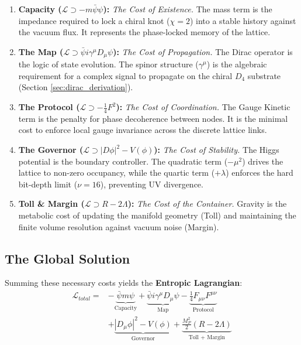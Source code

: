 \begin{enumerate}
    \item \textbf{Capacity ($\mathcal{L} \supset -m\bar{\psi}\psi$):} 
    \textit{The Cost of Existence.} The mass term is the impedance required to lock a chiral knot ($\chi=2$) into a stable history against the vacuum flux. It represents the phase-locked memory of the lattice.

    \item \textbf{The Map ($\mathcal{L} \supset \bar{\psi} i \gamma^\mu D_\mu \psi$):} 
    \textit{The Cost of Propagation.} The Dirac operator is the logic of state evolution. The spinor structure ($\gamma^\mu$) is the algebraic requirement for a complex signal to propagate on the chiral $D_4$ substrate (Section \ref{sec:dirac_derivation}).

    \item \textbf{The Protocol ($\mathcal{L} \supset -\frac{1}{4}F^2$):} 
    \textit{The Cost of Coordination.} The Gauge Kinetic term is the penalty for phase decoherence between nodes. It is the minimal cost to enforce local gauge invariance across the discrete lattice links.

    \item \textbf{The Governor ($\mathcal{L} \supset |D\phi|^2 - V(\phi)$):} 
    \textit{The Cost of Stability.} The Higgs potential is the boundary controller. The quadratic term ($-\mu^2$) drives the lattice to non-zero occupancy, while the quartic term ($+\lambda$) enforces the hard bit-depth limit ($\nu=16$), preventing UV divergence.

    \item \textbf{Toll \& Margin ($\mathcal{L} \supset R - 2\Lambda$):} 
    \textit{The Cost of the Container.} Gravity is the metabolic cost of updating the manifold geometry (Toll) and maintaining the finite volume resolution against vacuum noise (Margin).
\end{enumerate}

\subsection{The Global Solution}
Summing these necessary costs yields the \textbf{Entropic Lagrangian}:
\begin{equation}
\begin{split}
\mathcal{L}_{total} =
& - \underbrace{\bar{\psi} m \psi}_{\text{Capacity}}
+ \underbrace{\bar{\psi} i\gamma^\mu D_\mu \psi}_{\text{Map}} 
- \underbrace{\frac{1}{4}F_{\mu\nu}F^{\mu\nu}}_{\text{Protocol}} \\
& + \underbrace{|D_\mu\phi|^2 - V(\phi)}_{\text{Governor}} 
+ \underbrace{\frac{M_P^2}{2}(R - 2\Lambda)}_{\text{Toll + Margin}}
\end{split}
\end{equation}

